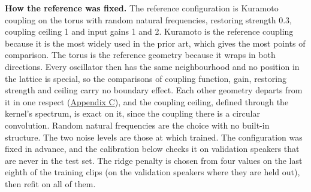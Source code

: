 \documentclass{article}
\begin{document}
\textbf{How the reference was fixed.} The reference configuration is
Kuramoto coupling on the torus with random natural frequencies,
restoring strength 0.3, coupling ceiling 1 and input gains 1 and 2.
Kuramoto is the reference coupling because it is the most widely used in
the prior art, which gives the most points of comparison. The torus is
the reference geometry because it wraps in both directions. Every
oscillator then has the same neighbourhood and no position in the
lattice is special, so the comparisons of coupling function, gain,
restoring strength and ceiling carry no boundary effect. Each other
geometry departs from it in one respect (\hyperref[sec-C]{Appendix C}),
and the coupling ceiling, defined through the kernel's spectrum, is
exact on it, since the coupling there is a circular convolution. Random
natural frequencies are the choice with no built-in structure. The two
noise levels are those at which \citet{young2026} trained. The
configuration was fixed in advance, and the calibration below checks it
on validation speakers that are never in the test set. The ridge penalty
is chosen from four values on the last eighth of the training clips (on
the validation speakers where they are held out), then refit on all of
them.
\end{document}
